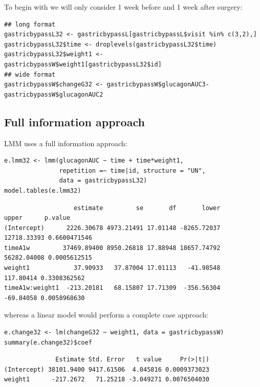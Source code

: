 \documentclass[12pt]{article}
\begin{document}
To begin with we will only consider 1 week before and 1 week after
surgery:
\lstset{language=r,label= ,caption= ,captionpos=b,numbers=none}
\begin{lstlisting}
## long format
gastricbypassL32 <- gastricbypassL[gastricbypassL$visit %in% c(3,2),]
gastricbypassL32$time <- droplevels(gastricbypassL32$time)
gastricbypassL32$weight1 <- gastricbypassW$weight1[gastricbypassL32$id]
## wide format
gastricbypassW$changeG32 <- gastricbypassW$glucagonAUC3-gastricbypassW$glucagonAUC2
\end{lstlisting}

\clearpage

\subsection{Full information approach}
\label{sec:org1c04800}

LMM uses a full information approach:
\lstset{language=r,label= ,caption= ,captionpos=b,numbers=none}
\begin{lstlisting}
e.lmm32 <- lmm(glucagonAUC ~ time + time*weight1,
               repetition =~ time|id, structure = "UN",
               data = gastricbypassL32)
model.tables(e.lmm32)
\end{lstlisting}

\begin{verbatim}
                   estimate         se       df       lower       upper      p.value
(Intercept)      2226.30678 4973.21491 17.01148 -8265.72037 12718.33393 0.6600471546
timeA1w         37469.89400 8950.26818 17.88948 18657.74792 56282.04008 0.0005612515
weight1            37.90933   37.87004 17.01113   -41.98548   117.80414 0.3308362562
timeA1w:weight1  -213.20181   68.15807 17.71309  -356.56304   -69.84058 0.0058968630
\end{verbatim}


whereas a linear model would perform a complete case approach:
\lstset{language=r,label= ,caption= ,captionpos=b,numbers=none}
\begin{lstlisting}
e.change32 <- lm(changeG32 ~ weight1, data = gastricbypassW)
summary(e.change32)$coef
\end{lstlisting}

\begin{verbatim}
              Estimate Std. Error   t value     Pr(>|t|)
(Intercept) 38101.9400 9417.61506  4.045816 0.0009373023
weight1      -217.2672   71.25218 -3.049271 0.0076504030
\end{verbatim}
\end{document}

